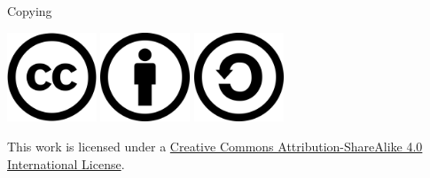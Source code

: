 \documentclass[pdf]{beamer}
\begin{document}
\begin{frame}{Copying}\Large
  \begin{center}
    \includegraphics[width=0.2\textwidth]{CC.png}
    \includegraphics[width=0.2\textwidth]{BY.png}
    \includegraphics[width=0.2\textwidth]{SA.png}
  \end{center}

  This work is licensed under a
  \href{https://creativecommons.org/licenses/by-sa/4.0/}{Creative Commons
  Attribution-ShareAlike 4.0 International License}.
\end{frame}
\end{document}
